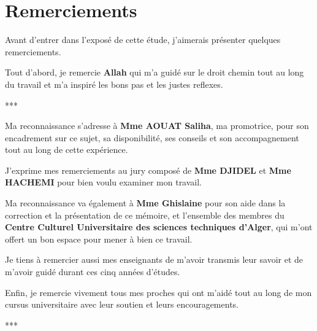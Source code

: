\begin{titlepage}
\itshape

\chapter*{Remerciements}

Avant d'entrer dans l'exposé de cette étude, j'aimerais présenter quelques remerciements.

Tout d'abord, je remercie \textbf{Allah} qui m'a guidé sur le droit chemin tout
au long du travail et m'a inspiré les bons pas et les justes reflexes.
\begin{center}
***
\end{center}
Ma reconnaissance s'adresse à \textbf{Mme AOUAT Saliha}, ma promotrice,
pour son encadrement sur ce sujet, sa disponibilité, ses conseils et son accompagnement
tout au long de cette expérience.

J'exprime mes remerciements au jury composé de \textbf{Mme DJIDEL} et \textbf{Mme HACHEMI}
pour bien voulu examiner mon travail.

Ma reconnaissance va également à \textbf{Mme Ghislaine} pour son aide dans
la correction et la présentation de ce mémoire, et l'ensemble des membres du
\textbf{Centre Culturel Universitaire des sciences techniques d'Alger}, qui
m'ont offert un bon espace pour mener à bien ce travail.

Je tiens à remercier aussi mes enseignants de m'avoir transmis leur savoir et
de m'avoir guidé durant ces cinq années d'études.

Enfin, je remercie vivement tous mes proches qui ont m'aidé tout au long de mon
cursus universitaire avec leur soutien et leurs encouragements.
\begin{center}
***
\end{center}
\end{titlepage}
